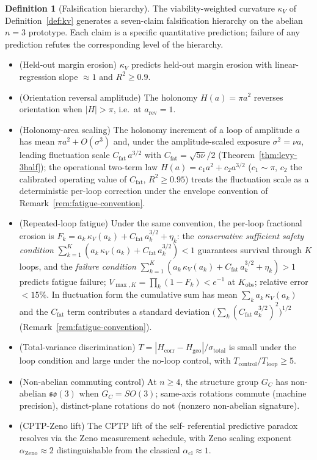 \documentclass[11pt,a4paper]{article}
\theoremstyle{plain}
\theoremstyle{definition}
\newtheorem{definition}[theorem]{Definition}
\theoremstyle{remark}
\newcommand{\kk}{\kappa_{\!V}}
\newcommand{\so}{\mathfrak{so}}
\begin{document}
\begin{definition}[Falsification hierarchy]
\label{def:hierarchy}
The viability-weighted curvature $\kk$ of
Definition~\ref{def:kv} generates
a seven-claim falsification
hierarchy on the abelian $n=3$ prototype. Each claim is a
specific quantitative prediction; failure of any prediction refutes
the corresponding level of the hierarchy.
\begin{itemize}[leftmargin=1.2em,itemsep=2pt]
\item[\textbf{A.}] (Held-out margin erosion) $\kk$ predicts held-out
margin erosion with linear-regression slope $\approx 1$ and $R^2\geq 0.9$.
\item[\textbf{B.}] (Orientation reversal amplitude) The holonomy
$H(a)=\pi a^2$ reverses orientation when $|H|>\pi$, i.e.\ at
$a_{\mathrm{rev}}=1$.
\item[\textbf{C.}] (Holonomy-area scaling) The holonomy increment
of a loop of amplitude $a$ has mean $\pi a^{2}+O(\sigma^{3})$ and,
under the amplitude-scaled exposure $\sigma^{2}=\nu a$, leading
fluctuation scale $C_{\mathrm{fat}}\,a^{3/2}$ with
$C_{\mathrm{fat}}=\sqrt{5\nu}/2$
(Theorem~\ref{thm:levy-3half}); the operational two-term law
$H(a)=c_1a^{2}+c_2a^{3/2}$ ($c_1\sim\pi$, $c_2$ the calibrated
operating value of $C_{\mathrm{fat}}$, $R^{2}\geq 0.95$) treats the
fluctuation scale as a deterministic per-loop correction under the
envelope convention of Remark~\ref{rem:fatigue-convention}.
\item[\textbf{D.}] (Repeated-loop fatigue) Under the same
convention, the per-loop fractional erosion is
$F_k = a_k\,\kk(a_k) + C_{\mathrm{fat}}\,a_k^{3/2} + \eta_k$:
the \emph{conservative sufficient safety condition}
$\sum_{k=1}^{K}(a_k\,\kk(a_k) + C_{\mathrm{fat}}\,a_k^{3/2}) < 1$
guarantees survival through $K$ loops, and the \emph{failure
condition}
$\sum_{k=1}^{K}(a_k\,\kk(a_k) + C_{\mathrm{fat}}\,a_k^{3/2} + \eta_k) > 1$
predicts fatigue failure; $V_{\max,K}=\prod_k(1-F_k)<e^{-1}$ at
$K_{\mathrm{obs}}$; relative error $<15\%$. In fluctuation form the
cumulative sum has mean $\sum_k a_k\,\kk(a_k)$ and the
$C_{\mathrm{fat}}$ term contributes a standard deviation
$\bigl(\sum_k (C_{\mathrm{fat}}\,a_k^{3/2})^{2}\bigr)^{1/2}$
(Remark~\ref{rem:fatigue-convention}).
\item[\textbf{E.}] (Total-variance discrimination) $T =
|H_{\mathrm{corr}}-H_{\mathrm{geo}}|/\sigma_{\mathrm{total}}$ is small
under the loop condition and large under the no-loop control, with
$T_{\mathrm{control}}/T_{\mathrm{loop}}\geq 5$.
\item[\textbf{F.}] (Non-abelian commuting control) At $n\geq 4$, the
structure group $G_C$ has non-abelian $\so(3)$ when $G_C = SO(3)$; same-axis
rotations commute (machine precision), distinct-plane rotations do not
(nonzero non-abelian signature).
\item[\textbf{G.}] (CPTP-Zeno lift) The CPTP lift of the self-
referential predictive paradox resolves via the Zeno measurement
schedule, with Zeno scaling exponent $\alpha_{\mathrm{Zeno}}\approx 2$
distinguishable from the classical $\alpha_{\mathrm{cl}}\approx 1$.
\end{itemize}
\end{definition}
\end{document}
